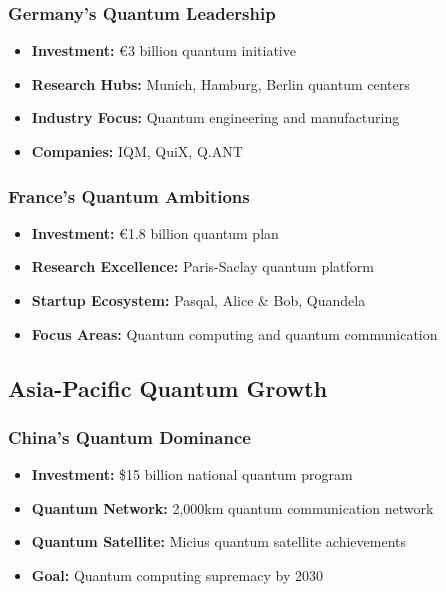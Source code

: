 \documentclass[12pt,a4paper]{article}
\begin{document}
\subsubsection{Germany's Quantum Leadership}
\begin{itemize}
    \item \textbf{Investment:} €3 billion quantum initiative
    \item \textbf{Research Hubs:} Munich, Hamburg, Berlin quantum centers
    \item \textbf{Industry Focus:} Quantum engineering and manufacturing
    \item \textbf{Companies:} IQM, QuiX, Q.ANT
\end{itemize}

\subsubsection{France's Quantum Ambitions}
\begin{itemize}
    \item \textbf{Investment:} €1.8 billion quantum plan
    \item \textbf{Research Excellence:} Paris-Saclay quantum platform
    \item \textbf{Startup Ecosystem:} Pasqal, Alice \& Bob, Quandela
    \item \textbf{Focus Areas:} Quantum computing and quantum communication
\end{itemize}

\subsection{Asia-Pacific Quantum Growth}

\subsubsection{China's Quantum Dominance}
\begin{itemize}
    \item \textbf{Investment:} \$15 billion national quantum program
    \item \textbf{Quantum Network:} 2,000km quantum communication network
    \item \textbf{Quantum Satellite:} Micius quantum satellite achievements
    \item \textbf{Goal:} Quantum computing supremacy by 2030
\end{itemize}
\end{document}

